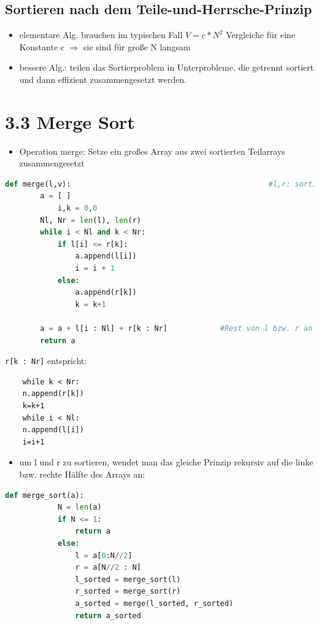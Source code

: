 \documentclass[11pt, fleqn]{scrreprt}
\begin{document}
	
	\subsection*{Sortieren nach dem Teile-und-Herrsche-Prinzip}
	
	\begin{itemize} 
		\item elementare Alg. brauchen im typischen Fall $V= c * N^2$ Vergleiche für eine Konstante c $\Rightarrow$ sie sind für große N langsam
		\item bessere Alg.: teilen das Sortierproblem in Unterprobleme, die getrennt sortiert und dann effizient zusammengesetzt werden.
		
	\end{itemize}
	
	\section*{3.3 Merge Sort}
	
	\begin{itemize}
		\item Operation merge: Setze ein großes Array aus zwei sortierten Teilarrays zusammengesetzt
	\end{itemize}
	
	\begin{lstlisting}[language=Python]
	def merge(l,v): 											#l,r: sortierte Teilarrays
		a = [ ] 														#leeres Array fuer das Ergebnis
			i,k = 0,0
		Nl, Nr = len(l), len(r)
		while i < Nl and k < Nr:
			if l[i] <= r[k]:
				a.append(l[i])
				i = i + 1
			else:
				a.append(r[k])
				k = k+1
	
		a = a + l[i : Nl] + r[k : Nr]			 #Rest von l bzw. r an a anhaengen
		return a
	\end{lstlisting}
	
	
	\verb|r[k : Nr]| entspricht: \\
	\begin{lstlisting}
	while k < Nr:
	n.append(r[k])
	k=k+1
	while i < Nl:
	n.append(l[i])
	i=i+1
	\end{lstlisting}
	
	
	\begin{itemize}
		\item um l und r zu sortieren, wendet man das gleiche Prinzip $\underline{\text{rekursiv}}$ auf die linke bzw. rechte Hälfte des Arrays an:
	\end{itemize}
		
	\begin{lstlisting}[language=Python]
		def merge_sort(a):
			N = len(a)
			if N <= 1:  																#leeres Array oder mit 1 Element ...
				return a    															#...ist automatisch sortiert
			else:
				l = a[0:N//2]       											#N//2 = "floor division", rundet ab
				r = a[N//2 : N]
				l_sorted = merge_sort(l)								  # teile-und-herrsche
				r_sorted = merge_sort(r) 	
				a_sorted = merge(l_sorted, r_sorted)
				return a_sorted
	\end{lstlisting}
		
\end{document}
